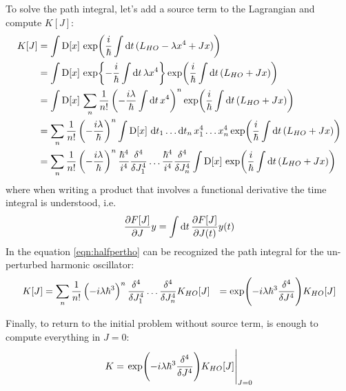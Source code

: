 \documentclass[main.tex]{subfiles}
\begin{document}
To solve the path integral, let's add a source term to the Lagrangian and compute $K[J]$:
\begin{align}
K[J] &= \int \DD{x} \exp( \frac{i}{\hbar} \int \dd{t} (L_{HO} - \lambda x^4 + Jx ) ) \\
&= \int \DD{x} \exp{ -\frac{i}{\hbar} \int \dd{t} \lambda x^4} \exp( \frac{i}{\hbar} \int \dd{t} (L_{HO} + Jx ) ) \\
&= \int \DD{x} \sum_n \frac{1}{n!} \left( -\frac{i\lambda}{\hbar} \int \dd{t} x^4 \right)^n \exp( \frac{i}{\hbar} \int \dd{t} (L_{HO} + Jx ) ) \\
&= \sum_n \frac{1}{n!} \left( -\frac{i\lambda}{\hbar} \right)^n \int \DD{x} \dd{t_1} \dots \dd{t_n} x_1^4 \dots x_n^4 \exp( \frac{i}{\hbar} \int \dd{t} (L_{HO} + Jx ) ) \\
&= \sum_n \frac{1}{n!} \left( -\frac{i\lambda}{\hbar} \right)^n \frac{\hbar^4}{i^4}\fdv[4]{J_1}\dots\frac{\hbar^4}{i^4}\fdv[4]{J_n} \int \DD{x} \exp( \frac{i}{\hbar} \int \dd{t} (L_{HO} + Jx ) ) \label{eqn:halfpertho}
\end{align}
where when writing a product that involves a functional derivative the time integral is understood, i.e.
\begin{equation}
\pdv{F[J]}{J} y = \int \dd{t} \pdv{F[J]}{J(t)} y(t)
\end{equation}
In the equation \eqref{eqn:halfpertho} can be recognized the path integral for the un-perturbed harmonic oscillator:
\begin{align}
K[J] &= \sum_n \frac{1}{n!} \left( -i\lambda\hbar^3 \right)^n \fdv[4]{J_1}\dots\fdv[4]{J_n} K_{HO}[J]
&= \exp( -i\lambda\hbar^3 \fdv[4]{J} ) K_{HO}[J]
\end{align}

Finally, to return to the initial problem without source term, is enough to compute everything in $J=0$:
\begin{equation}
K = \eval{ \exp( -i\lambda\hbar^3 \fdv[4]{J} ) K_{HO}[J] }_{J=0}
\end{equation}
\end{document}
